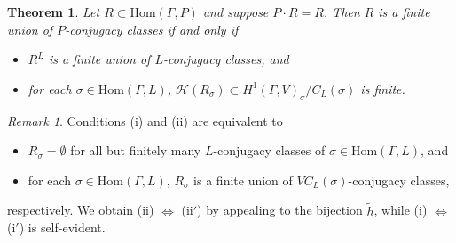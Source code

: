 \documentclass[12pt, a4paper]{amsart}
\numberwithin{equation}{section}
\newtheorem{thm}[equation]{Theorem}
\theoremstyle{definition}
\theoremstyle{remark}
\newtheorem{rem}[equation]{Remark}
\theoremstyle{remark}
\begin{document}
\begin{thm} \label{thm1} Let $R \subset \mathrm{Hom}(\Gamma, P)$ and suppose $P\cdot R = R$. Then $R$ is a finite union of $P$-conjugacy classes if and only if
\begin{itemize}
	\item[(i)] $R^L$ is a finite union of $L$-conjugacy classes, and
	\item[(ii)] for each $\sigma \in \mathrm{Hom}(\Gamma, L)$, $\mathcal{H}(R_\sigma) \subset H^1(\Gamma, V)_\sigma / C_L(\sigma)$ is finite.
\end{itemize}
\end{thm}
\begin{rem} Conditions (i) and (ii) are equivalent to
\begin{itemize}
\item[(i$'$)] $R_\sigma = \emptyset$ for all but finitely many $L$-conjugacy classes of $\sigma \in \mathrm{Hom}(\Gamma, L)$, and
\item[(ii$'$)] for each $\sigma \in \mathrm{Hom}(\Gamma, L)$, $R_\sigma$ is a finite union of $VC_L(\sigma)$-conjugacy classes,
\end{itemize}
respectively. We obtain (ii) $\Leftrightarrow$ (ii$'$) by appealing to the bijection $\widetilde{h}$, while (i) $\Leftrightarrow$ (i$'$) is self-evident.
\end{rem}
\end{document}
